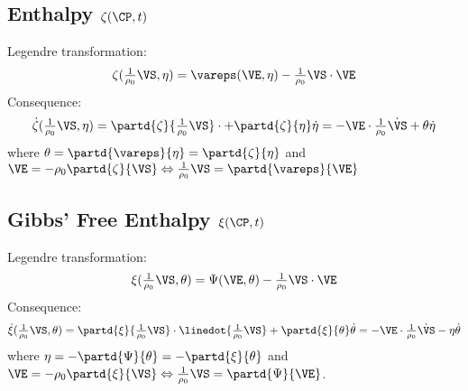 \documentclass[a5paper,twosided,11pt,DIV=15,BCOR=0mm]{scrbook}
\newcommand{\veps}{\vareps}
\newcommand{\rhoz}{\tfrac{1}{\rho_0}}
\begin{document}
\subsection{Enthalpy $\zeta(\CP,t)$}
Legendre transformation:
\begin{equation}
  \zeta(\rhoz\VS,\eta) = \veps(\VE,\eta) - \rhoz\VS\cdot\VE
\end{equation}
Consequence:
\begin{equation}
\dot{\zeta}(\rhoz\VS,\eta) = \partd{\zeta}{\rhoz\VS}\cdot+\partd{\zeta}{\eta}\dot{\eta}
= - \VE \cdot \rhoz\dot{\VS}+\theta\dot{\eta}
\end{equation}
where $\theta=\partd{\veps}{\eta}=\partd{\zeta}{\eta}$ and
$\VE=-\rho_0\partd{\zeta}{\VS}\Leftrightarrow\rhoz\VS=\partd{\veps}{\VE}$
\subsection{Gibbs' Free Enthalpy $\xi(\CP,t)$}
Legendre transformation:
\begin{equation}
  \xi(\rhoz\VS,\theta)=\Psi(\VE,\theta)-\rhoz\VS\cdot\VE
\end{equation}
Consequence:
\begin{equation}
\textstyle
    \dot{\xi}(\rhoz\VS,\theta) =
    \partd{\xi}{\rhoz\VS}\cdot\linedot{\rhoz\VS}+\partd{\xi}{\theta}\dot{\theta}
    =-\VE\cdot\rhoz\dot{\VS}-\eta\dot{\theta}
\end{equation}
where $\eta=-\partd{\Psi}{\theta} = -\partd{\xi}{\theta}$ and
$\VE=-\rho_0\partd{\xi}{\VS}\Leftrightarrow\rhoz\VS=\partd{\Psi}{\VE}$.
\end{document}
